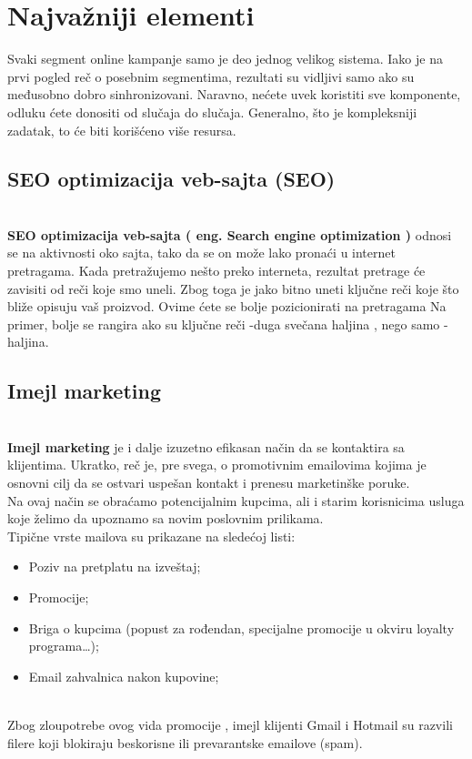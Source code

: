 \documentclass[a4paper]{article}
\begin{document}
{\section{Najvažniji elementi}
\label{sec:najvažniji elementi}
Svaki segment online kampanje samo je deo jednog velikog sistema. Iako je na prvi pogled reč o posebnim segmentima, rezultati su vidljivi samo ako su međusobno dobro sinhronizovani. Naravno, nećete uvek koristiti sve komponente, odluku ćete donositi od slučaja do slučaja. Generalno, što je kompleksniji zadatak, to će biti korišćeno više resursa.
\subsection{SEO optimizacija veb-sajta (SEO)}
\label{subsec:SEO}
\\\textbf {SEO optimizacija veb-sajta  ( eng. Search engine optimization )} odnosi se na aktivnosti oko sajta, tako da se on može lako pronaći u internet pretragama. Kada pretražujemo nešto preko interneta, rezultat pretrage će zavisiti od reči koje smo uneli. Zbog toga je jako bitno uneti ključne reči koje što bliže opisuju vaš proizvod. Ovime ćete se bolje pozicionirati na pretragama
Na primer, bolje se rangira ako su ključne reči -duga svečana haljina  , nego samo -haljina.
\subsection{Imejl marketing}
\label{subsec:Imejl}
\\\textbf{Imejl marketing} je i dalje izuzetno efikasan način da se kontaktira sa klijentima. Ukratko, reč je, pre svega, o promotivnim emailovima kojima je osnovni cilj da se ostvari uspešan kontakt i prenesu marketinške poruke.
\\Na ovaj način se obraćamo potencijalnim kupcima, ali i starim korisnicima usluga koje želimo da upoznamo sa novim poslovnim prilikama.
\\Tipične vrste mailova su prikazane na sledećoj listi: 
\begin{itemize}
    \item Poziv na pretplatu na izveštaj;
    \item Promocije;
    \item Briga o kupcima (popust za rođendan, specijalne promocije u okviru loyalty programa…);
    \item Email zahvalnica nakon kupovine;
    \label{item:email}
\end{itemize}
\\Zbog zloupotrebe ovog vida promocije , imejl klijenti  Gmail i Hotmail su razvili filere koji  blokiraju beskorisne ili prevarantske emailove (spam).
}
\end{document}
